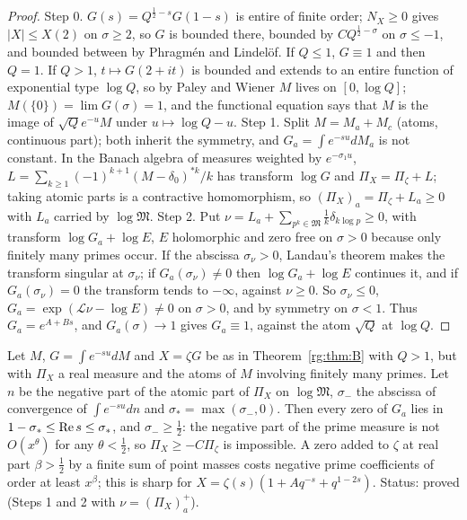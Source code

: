 \begin{proof}
Step 0. $G(s)=Q^{\frac12-s}G(1-s)$ is entire of finite order; $N_X\ge0$ gives $|X|\le X(2)$ on $\sigma\ge2$, so $G$ is bounded there, bounded by $CQ^{\frac12-\sigma}$ on $\sigma\le-1$, and bounded between by Phragm\'en and Lindel\"of. If $Q\le1$, $G\equiv1$ and then $Q=1$. If $Q>1$, $t\mapsto G(2+it)$ is bounded and extends to an entire function of exponential type $\log Q$, so by Paley and Wiener $M$ lives on $[0,\log Q]$; $M(\{0\})=\lim G(\sigma)=1$, and the functional equation says that $M$ is the image of $\sqrt Qe^{-u}M$ under $u\mapsto\log Q-u$. Step 1. Split $M=M_a+M_c$ (atoms, continuous part); both inherit the symmetry, and $G_a=\int e^{-su}dM_a$ is not constant. In the Banach algebra of measures weighted by $e^{-\sigma_1u}$, $L=\sum_{k\ge1}(-1)^{k+1}(M-\delta_0)^{*k}/k$ has transform $\log G$ and $\Pi_X=\Pi_\zeta+L$; taking atomic parts is a contractive homomorphism, so $(\Pi_X)_a=\Pi_\zeta+L_a\ge0$ with $L_a$ carried by $\log\mathfrak M$. Step 2. Put $\nu=L_a+\sum_{p^k\in\mathfrak M}\frac1k\delta_{k\log p}\ge0$, with transform $\log G_a+\log E$, $E$ holomorphic and zero free on $\sigma>0$ because only finitely many primes occur. If the abscissa $\sigma_\nu>0$, Landau's theorem makes the transform singular at $\sigma_\nu$; if $G_a(\sigma_\nu)\ne0$ then $\log G_a+\log E$ continues it, and if $G_a(\sigma_\nu)=0$ the transform tends to $-\infty$, against $\nu\ge0$. So $\sigma_\nu\le0$, $G_a=\exp(\mathcal L\nu-\log E)\ne0$ on $\sigma>0$, and by symmetry on $\sigma<1$. Thus $G_a=e^{A+Bs}$, and $G_a(\sigma)\to1$ gives $G_a\equiv1$, against the atom $\sqrt Q$ at $\log Q$. \qedhere
\end{proof}

\begin{theorem}\label{rg:thm:Bq}
Let $M$, $G=\int e^{-su}dM$ and $X=\zeta G$ be as in Theorem~\ref{rg:thm:B} with $Q>1$, but with $\Pi_X$ a real measure and the atoms of $M$ involving finitely many primes. Let $n$ be the negative part of the atomic part of $\Pi_X$ on $\log\mathfrak M$, $\sigma_-$ the abscissa of convergence of $\int e^{-su}dn$ and $\sigma_*=\max(\sigma_-,0)$. Then every zero of $G_a$ lies in $1-\sigma_*\le\operatorname{Re} s\le\sigma_*$, and $\sigma_-\ge\frac12$: the negative part of the prime measure is not $O(x^\theta)$ for any $\theta<\frac12$, so $\Pi_X\ge-C\Pi_\zeta$ is impossible. A zero added to $\zeta$ at real part $\beta>\frac12$ by a finite sum of point masses costs negative prime coefficients of order at least $x^\beta$; this is sharp for $X=\zeta(s)(1+Aq^{-s}+q^{1-2s})$. Status: proved (Steps 1 and 2 with $\nu=(\Pi_X)_a^+$).
\end{theorem}

